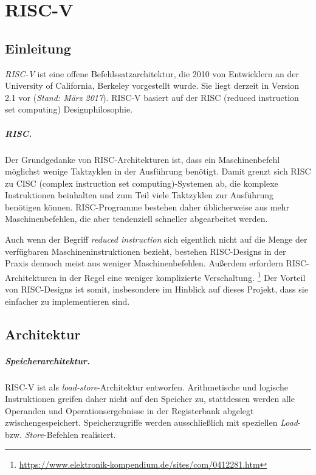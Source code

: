 \chapter{RISC-V} %
\label{RISC-V} %

\section{Einleitung}
\emph{RISC-V} ist eine offene Befehlssatzarchitektur, die 2010 von
Entwicklern an der University of California, Berkeley vorgestellt wurde.
Sie liegt derzeit in Version 2.1 vor (\textit{Stand: März 2017}). RISC-V
basiert auf der RISC (reduced instruction set computing) Designphilosophie.

\paragraph{RISC.} Der Grundgedanke von RISC-Architekturen ist, dass ein Maschinenbefehl möglichst wenige Taktzyklen in der Ausführung benötigt. Damit grenzt sich RISC zu CISC (complex instruction set computing)-Systemen ab, die komplexe Instruktionen beinhalten und zum Teil viele Taktzyklen zur Ausführung benötigen können. RISC-Programme bestehen daher üblicherweise aus mehr Maschinenbefehlen, die aber tendenziell schneller abgearbeitet werden.

Auch wenn der Begriff \textit{reduced instruction} sich
eigentlich nicht auf die Menge der verfügbaren Maschineninstruktionen
bezieht, bestehen RISC-Designs in der Praxis dennoch meist aus weniger
Maschinenbefehlen. Außerdem erfordern RISC-Architekturen in der Regel eine weniger komplizierte Verschaltung. \footnote{\url{https://www.elektronik-kompendium.de/sites/com/0412281.htm}} Der Vorteil von RISC-Designs ist somit, insbesondere im Hinblick auf dieses Projekt, dass sie einfacher zu implementieren sind.

\section{Architektur}
\label{subsec:Register}

\paragraph{Speicherarchitektur.} RISC-V ist als
\textit{load-store}-Architektur entworfen. Arithmetische und logische
Instruktionen greifen daher nicht auf den Speicher zu, stattdessen
werden alle Operanden und Operationsergebnisse in der Registerbank
abgelegt zwischengespeichert.
Speicherzugriffe werden ausschließlich mit speziellen \textit{Load}- bzw. \textit{Store}-Befehlen realisiert.

